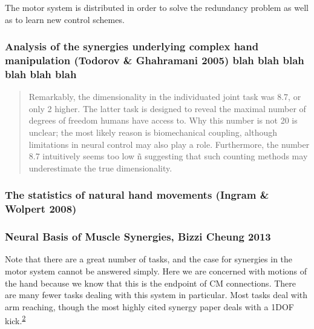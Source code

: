 {            The motor system is distributed in order to solve the
            redundancy problem as well as to learn new control schemes.

            \hypertarget{analysis-of-the-synergies-underlying-complex-hand-manipulation-todorov-ghahramani-2005-blah-blah-blah-blah-blah-blah}{%
            \subsubsection{Analysis of the synergies underlying complex
            hand manipulation (Todorov \& Ghahramani 2005) blah blah
            blah blah blah
            blah}\label{analysis-of-the-synergies-underlying-complex-hand-manipulation-todorov-ghahramani-2005-blah-blah-blah-blah-blah-blah}}

            \begin{quote}
            Remarkably, the dimensionality in the individuated joint
            task was 8.7, or only 2 higher. The latter task is designed
            to reveal the maximal number of degrees of freedom humans
            have access to. Why this number is not 20 is unclear; the
            most likely reason is biomechanical coupling, although
            limitations in neural control may also play a role.
            Furthermore, the number 8.7 intuitively seems too low ñ
            suggesting that such counting methods may underestimate the
            true dimensionality.
            \end{quote}

            \hypertarget{the-statistics-of-natural-hand-movements-ingram-wolpert-2008}{%
            \subsubsection{The statistics of natural hand movements
            (Ingram \& Wolpert
            2008)}\label{the-statistics-of-natural-hand-movements-ingram-wolpert-2008}}

            \hypertarget{neural-basis-of-muscle-synergies-bizzi-cheung-2013}{%
            \subsubsection{Neural Basis of Muscle Synergies, Bizzi
            Cheung
            2013}\label{neural-basis-of-muscle-synergies-bizzi-cheung-2013}}

            Note that there are a great number of tasks, and the case
            for synergies in the motor system cannot be answered simply.
            Here we are concerned with motions of the hand because we
            know that this is the endpoint of CM connections. There are
            many fewer tasks dealing with this system in particular.
            Most tasks deal with arm reaching, though the most highly
            cited synergy paper deals with a 1DOF
            kick.\textsuperscript{\protect\hyperlink{ref-DAvella2003}{2}}

}
